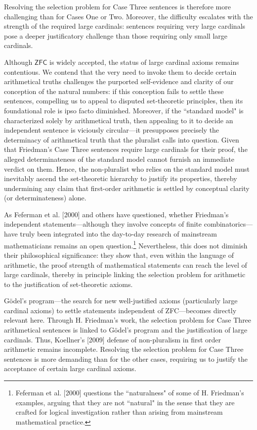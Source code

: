 \documentclass[a4paper,12pt]{amsart}
\theoremstyle{definition}
\numberwithin{equation}{section}
\begin{document}
Resolving the selection problem for Case Three sentences is therefore more challenging than for Cases One or Two. Moreover, the difficulty escalates with the strength of the required large cardinals: sentences requiring very large cardinals pose a deeper justificatory challenge than those requiring only small large cardinals.

Although $\mathsf{ZFC}$ is widely accepted, the status of large cardinal axioms remains contentious. We contend that the very need to invoke them to decide certain arithmetical truths challenges the purported self-evidence and clarity of our conception of the natural numbers: if this conception fails to settle these sentences, compelling us to appeal to disputed set-theoretic principles, then its foundational role is ipso facto diminished. Moreover, if the ``standard model" is characterized solely by arithmetical truth, then appealing to it to decide an independent sentence is viciously circular—it presupposes precisely the determinacy of arithmetical truth that the pluralist calls into question. Given that Friedman's Case Three sentences require large cardinals for their proof, the alleged determinateness of the standard model cannot furnish an immediate verdict on them. Hence, the non-pluralist who relies on the standard model must inevitably ascend the set-theoretic hierarchy to justify its properties, thereby undermining any claim that first-order arithmetic is settled by conceptual clarity (or determinateness) alone. 
                      
As Feferman et al. [2000] and others have questioned, whether Friedman's independent statements---although they involve concepts of finite combinatorics---have truly been integrated into the day-to-day research of mainstream mathematicians remains an open question.\footnote{Feferman et al. [2000]  questions the ``naturalness" of some of H. Friedman's  examples, arguing that they are not ``natural" in the sense that they are crafted for logical investigation rather than arising from mainstream mathematical  practice.} Nevertheless, this does not diminish their philosophical significance: they show that, even within the language of arithmetic, the proof strength of mathematical statements can reach the level of large cardinals, thereby in principle linking the selection problem for arithmetic to the justification of set-theoretic axioms.


Gödel's program—the search for new well-justified axioms (particularly large cardinal axioms) to settle statements independent of {\sf ZFC}—becomes directly relevant here. Through H. Friedman's work, the selection problem for Case Three arithmetical sentences is linked to Gödel's program and the justification of large cardinals. Thus, Koellner's [2009] defense of non-pluralism in first order arithmetic remains incomplete. Resolving the selection problem for Case Three sentences is more demanding than for the other cases, requiring us to justify the acceptance of certain large cardinal axioms. 
               
\end{document}
